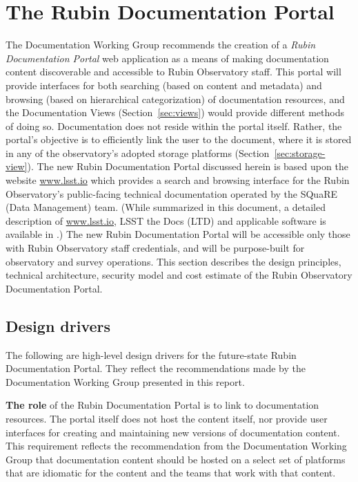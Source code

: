 \section{The Rubin Documentation Portal}
\label{sec:DocPortal}

The Documentation Working Group recommends the creation of a \emph{Rubin Documentation Portal} web application as a means of making documentation content discoverable and accessible to Rubin Observatory staff.
This portal will provide interfaces for both searching (based on content and metadata) and browsing (based on hierarchical categorization) of documentation resources, and the Documentation Views (Section~\ref{sec:views}) would provide different methods of doing so.
Documentation does not reside within the portal itself.
Rather, the portal's objective is to efficiently link the user to the document, where it is stored in any of the observatory's adopted storage platforms (Section~\ref{sec:storage-view}).
The new Rubin Documentation Portal discussed herein is based upon the website \url{www.lsst.io} which provides a search and browsing interface for the Rubin Observatory's public-facing technical documentation operated by the SQuaRE (Data Management) team. \citep{lsst.io-cite}
(While summarized in this document, a detailed description of \url{www.lsst.io}, LSST the Docs (LTD) and applicable software is available in .)
The new Rubin Documentation Portal will be accessible only those with Rubin Observatory staff credentials, and will be purpose-built for observatory and survey operations.
This section describes the design principles, technical architecture, security model and cost estimate of the Rubin Observatory Documentation Portal.

\subsection{Design drivers}

The following are high-level design drivers for the future-state Rubin Documentation Portal. 
They reflect the recommendations made by the Documentation Working Group presented in this report.

\textbf{The role} of the Rubin Documentation Portal is to link to documentation resources.
The portal itself does not host the content itself, nor provide user interfaces for creating and maintaining new versions of documentation content.
This requirement reflects the recommendation from the Documentation Working Group that documentation content should be hosted on a select set of platforms that are idiomatic for the content and the teams that work with that content.

